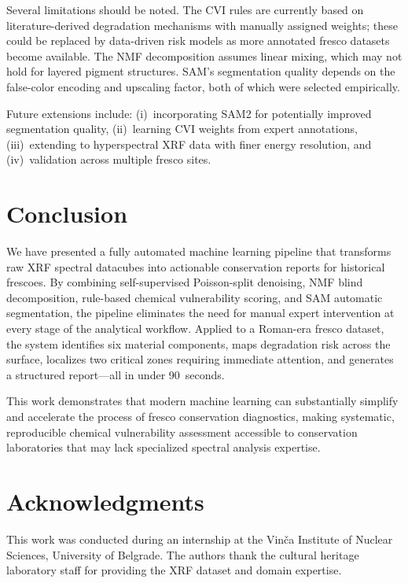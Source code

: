 \documentclass[twocolumn,11pt]{article}
\begin{document}
Several limitations should be noted. The CVI rules are currently based on
literature-derived degradation mechanisms with manually assigned weights;
these could be replaced by data-driven risk models as more annotated fresco
datasets become available. The NMF decomposition assumes linear mixing,
which may not hold for layered pigment structures. SAM's segmentation quality
depends on the false-color encoding and upscaling factor, both of which were
selected empirically.

Future extensions include: (i)~incorporating SAM2 for potentially improved
segmentation quality, (ii)~learning CVI weights from expert annotations,
(iii)~extending to hyperspectral XRF data with finer energy resolution, and
(iv)~validation across multiple fresco sites.


\section{Conclusion}
\label{sec:conclusion}

We have presented a fully automated machine learning pipeline that transforms
raw XRF spectral datacubes into actionable conservation reports for historical
frescoes. By combining self-supervised Poisson-split denoising, NMF blind
decomposition, rule-based chemical vulnerability scoring, and SAM automatic
segmentation, the pipeline eliminates the need for manual expert intervention
at every stage of the analytical workflow. Applied to a Roman-era fresco
dataset, the system identifies six material components, maps degradation risk
across the surface, localizes two critical zones requiring immediate
attention, and generates a structured report---all in under 90~seconds.

This work demonstrates that modern machine learning can substantially
simplify and accelerate the process of fresco conservation diagnostics,
making systematic, reproducible chemical vulnerability assessment accessible
to conservation laboratories that may lack specialized spectral analysis
expertise.


\section*{Acknowledgments}

This work was conducted during an internship at the Vin\v{c}a Institute of
Nuclear Sciences, University of Belgrade. The authors thank the cultural
heritage laboratory staff for providing the XRF dataset and domain expertise.
\end{document}
